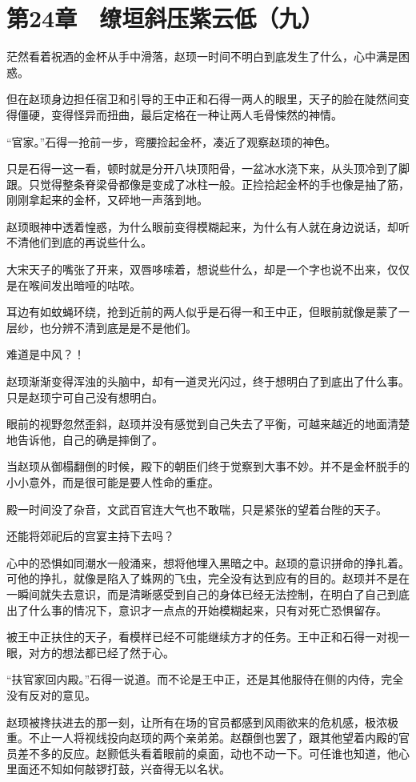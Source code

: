 \section{第24章　缭垣斜压紫云低（九）}

茫然看着祝酒的金杯从手中滑落，赵顼一时间不明白到底发生了什么，心中满是困惑。

但在赵顼身边担任宿卫和引导的王中正和石得一两人的眼里，天子的脸在陡然间变得僵硬，变得怪异而扭曲，最后定格在一种让两人毛骨悚然的神情。

“官家。”石得一抢前一步，弯腰捡起金杯，凑近了观察赵顼的神色。

只是石得一这一看，顿时就是分开八块顶阳骨，一盆冰水浇下来，从头顶冷到了脚跟。只觉得整条脊梁骨都像是变成了冰柱一般。正捡拾起金杯的手也像是抽了筋，刚刚拿起来的金杯，又砰地一声落到地。

赵顼眼神中透着惶惑，为什么眼前变得模糊起来，为什么有人就在身边说话，却听不清他们到底的再说些什么。

大宋天子的嘴张了开来，双唇哆嗦着，想说些什么，却是一个字也说不出来，仅仅是在喉间发出暗哑的咕哝。

耳边有如蚊蝇环绕，抢到近前的两人似乎是石得一和王中正，但眼前就像是蒙了一层纱，也分辨不清到底是是不是他们。

难道是中风？！

赵顼渐渐变得浑浊的头脑中，却有一道灵光闪过，终于想明白了到底出了什么事。只是赵顼宁可自己没有想明白。

眼前的视野忽然歪斜，赵顼并没有感觉到自己失去了平衡，可越来越近的地面清楚地告诉他，自己的确是摔倒了。

当赵顼从御榻翻倒的时候，殿下的朝臣们终于觉察到大事不妙。并不是金杯脱手的小小意外，而是很可能是要人性命的重症。

殿一时间没了杂音，文武百官连大气也不敢喘，只是紧张的望着台陛的天子。

还能将郊祀后的宫宴主持下去吗？

心中的恐惧如同潮水一般涌来，想将他埋入黑暗之中。赵顼的意识拼命的挣扎着。可他的挣扎，就像是陷入了蛛网的飞虫，完全没有达到应有的目的。赵顼并不是在一瞬间就失去意识，而是清晰感受到自己的身体已经无法控制，在明白了自己到底出了什么事的情况下，意识才一点点的开始模糊起来，只有对死亡恐惧留存。

被王中正扶住的天子，看模样已经不可能继续方才的任务。王中正和石得一对视一眼，对方的想法都已经了然于心。

“扶官家回内殿。”石得一说道。而不论是王中正，还是其他服侍在侧的内侍，完全没有反对的意见。

赵顼被搀扶进去的那一刻，让所有在场的官员都感到风雨欲来的危机感，极浓极重。不止一人将视线投向赵顼的两个亲弟弟。赵頵倒也罢了，跟其他望着内殿的官员差不多的反应。赵颢低头看着眼前的桌面，动也不动一下。可任谁也知道，他心里面还不知如何敲锣打鼓，兴奋得无以名状。

